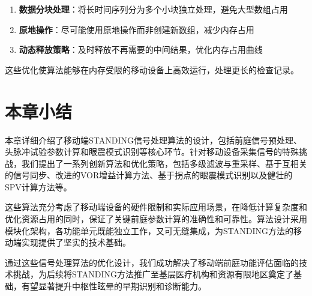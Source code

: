\begin{enumerate}
  \item \textbf{数据分块处理}：将长时间序列分为多个小块独立处理，避免大型数组占用
  \item \textbf{原地操作}：尽可能使用原地操作而非创建新数组，减少内存占用
  \item \textbf{动态释放策略}：及时释放不再需要的中间结果，优化内存占用曲线
\end{enumerate}

这些优化使算法能够在内存受限的移动设备上高效运行，处理更长的检查记录。

\section{本章小结}

本章详细介绍了移动端STANDING信号处理算法的设计，包括前庭信号预处理、头脉冲试验参数计算和眼震模式识别等核心环节。针对移动设备采集信号的特殊挑战，我们提出了一系列创新算法和优化策略，包括多级滤波与重采样、基于互相关的信号同步、改进的VOR增益计算方法、基于拐点的眼震模式识别以及健壮的SPV计算方法等。

这些算法充分考虑了移动端设备的硬件限制和实际应用场景，在降低计算复杂度和优化资源占用的同时，保证了关键前庭参数计算的准确性和可靠性。算法设计采用模块化架构，各功能单元既能独立工作，又可无缝集成，为STANDING方法的移动端实现提供了坚实的技术基础。

通过这些信号处理算法的优化设计，我们成功解决了移动端前庭功能评估面临的技术挑战，为后续将STANDING方法推广至基层医疗机构和资源有限地区奠定了基础，有望显著提升中枢性眩晕的早期识别和诊断能力。
